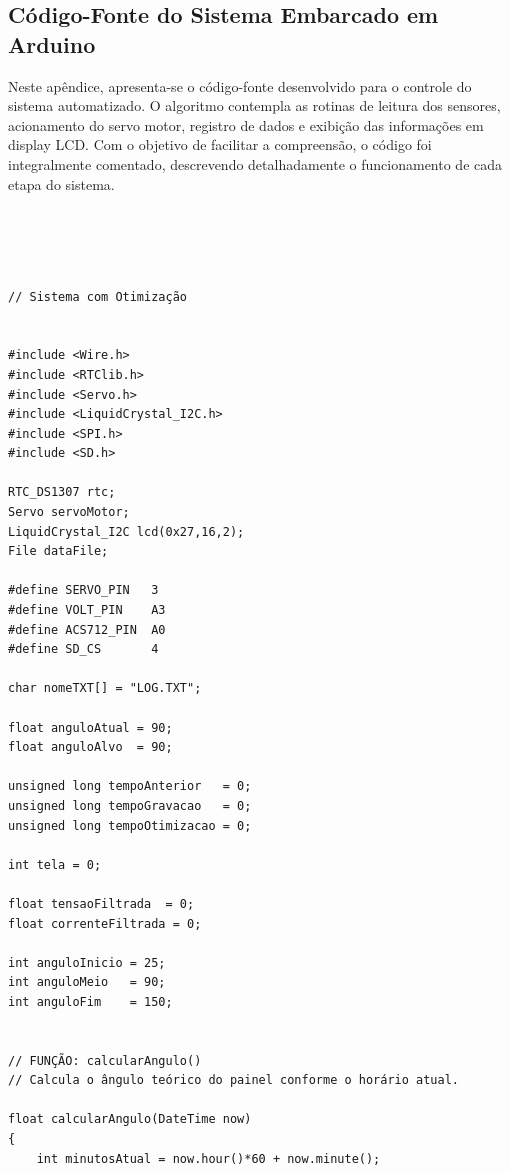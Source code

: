 
\begin{apendicesenv}

\partapendices

\chapter{Código-Fonte do Sistema Embarcado em Arduino}

Neste apêndice, apresenta-se o código-fonte desenvolvido para o controle do sistema automatizado. O algoritmo contempla as rotinas de leitura dos sensores, acionamento do servo motor, registro de dados e exibição das informações em display LCD. Com o objetivo de facilitar a compreensão, o código foi integralmente comentado, descrevendo detalhadamente o funcionamento de cada etapa do sistema.

% 
\begin{verbatim}



 
// Sistema com Otimização 


#include <Wire.h>
#include <RTClib.h>
#include <Servo.h>
#include <LiquidCrystal_I2C.h>
#include <SPI.h>
#include <SD.h>

RTC_DS1307 rtc;
Servo servoMotor;
LiquidCrystal_I2C lcd(0x27,16,2);
File dataFile;

#define SERVO_PIN   3
#define VOLT_PIN    A3
#define ACS712_PIN  A0
#define SD_CS       4

char nomeTXT[] = "LOG.TXT";

float anguloAtual = 90;
float anguloAlvo  = 90;

unsigned long tempoAnterior   = 0;
unsigned long tempoGravacao   = 0;
unsigned long tempoOtimizacao = 0;

int tela = 0;

float tensaoFiltrada  = 0;
float correnteFiltrada = 0;

int anguloInicio = 25;
int anguloMeio   = 90;
int anguloFim    = 150;


// FUNÇÃO: calcularAngulo()
// Calcula o ângulo teórico do painel conforme o horário atual.

float calcularAngulo(DateTime now)
{
    int minutosAtual = now.hour()*60 + now.minute();


\end{verbatim}
\end{apendicesenv}
